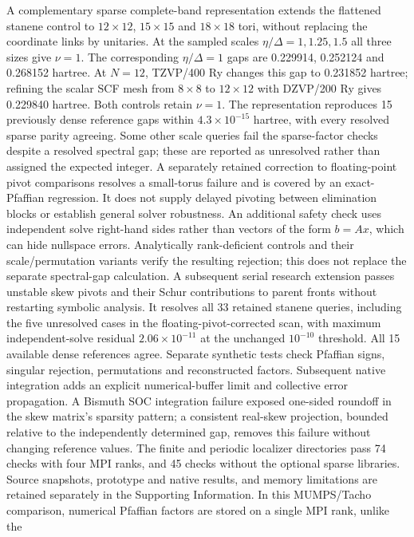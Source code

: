 A complementary sparse complete-band representation extends the
flattened stanene control to $12\times12$, $15\times15$ and
$18\times18$ tori, without replacing the coordinate links by
unitaries. At the sampled scales $\eta/\Delta=1,1.25,1.5$ all
three sizes give $\nu=1$. The corresponding $\eta/\Delta=1$
gaps are 0.229914, 0.252124 and 0.268152 hartree.
At $N=12$, TZVP/400 Ry changes this gap to 0.231852 hartree;
refining the scalar SCF mesh from $8\times8$ to $12\times12$
with DZVP/200 Ry gives 0.229840 hartree. Both controls retain
$\nu=1$. The representation reproduces 15 previously dense
reference gaps within $4.3\times10^{-15}$ hartree, with every
resolved sparse parity agreeing. Some other scale queries fail
the sparse-factor checks despite a resolved spectral gap; these
are reported as unresolved rather than assigned the expected
integer. A separately retained correction to floating-point pivot
comparisons resolves a small-torus failure and is covered by an
exact-Pfaffian regression. It does not supply delayed pivoting
between elimination blocks or establish general solver robustness.
An additional safety check uses independent solve right-hand
sides rather than vectors of the form $b=Ax$, which can hide
nullspace errors. Analytically rank-deficient controls and their
scale/permutation variants verify the resulting rejection; this
does not replace the separate spectral-gap calculation.
A subsequent serial research extension passes unstable skew pivots and
their Schur contributions to parent fronts without restarting symbolic
analysis. It resolves all 33 retained stanene queries, including the five
unresolved cases in the floating-pivot-corrected scan, with maximum
independent-solve residual $2.06\times10^{-11}$ at the unchanged
$10^{-10}$ threshold. All 15 available dense references agree.
Separate synthetic tests check Pfaffian signs, singular rejection,
permutations and reconstructed factors. Subsequent native integration
adds an explicit numerical-buffer limit and collective error propagation.
A Bismuth SOC integration failure exposed one-sided roundoff in the
skew matrix's sparsity pattern; a consistent real-skew projection,
bounded relative to the independently determined gap, removes this
failure without changing reference values. The finite and periodic
localizer directories pass 74 checks with four MPI ranks, and 45
checks without the optional sparse libraries. Source snapshots,
prototype and native results, and memory limitations are retained
separately in the Supporting Information. In this MUMPS/Tacho comparison,
numerical Pfaffian factors are stored on a single MPI rank, unlike the
